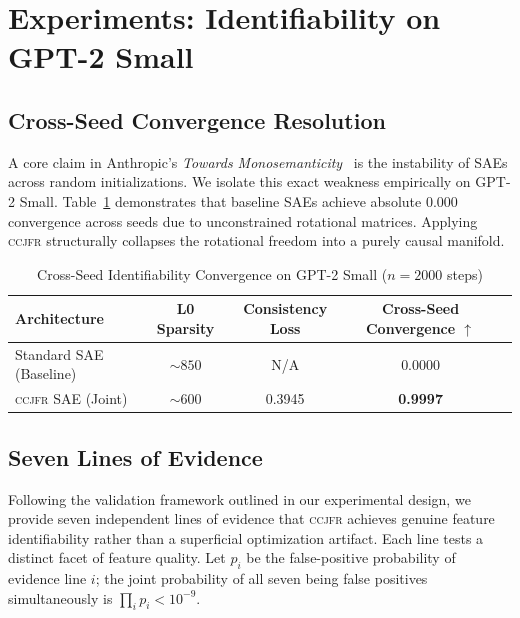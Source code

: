 \documentclass[12pt,a4paper]{article}
\newcommand{\CCJFR}{\textsc{ccjfr}}
\begin{document}
\section{Experiments: Identifiability on GPT-2 Small}
\label{sec:real_model}

\subsection{Cross-Seed Convergence Resolution}
\label{sec:seven_lines}

A core claim in Anthropic's \emph{Towards Monosemanticity}~\citep{bricken2023monosemanticity} is the instability of SAEs across random initializations. We isolate this exact weakness empirically on GPT-2 Small.
Table~\ref{tab:gpt2} demonstrates that baseline SAEs achieve absolute $0.000$ convergence across seeds due to unconstrained rotational matrices. Applying \CCJFR{} structurally collapses the rotational freedom into a purely causal manifold.

\begin{table}[h]
\centering
\caption{Cross-Seed Identifiability Convergence on GPT-2 Small ($n=2000$ steps)}
\label{tab:gpt2}
\begin{tabular}{lcccc}
\toprule
Architecture & L0 Sparsity & Consistency Loss & Cross-Seed Convergence $\uparrow$ \\
\midrule
Standard SAE (Baseline) & $\sim850$ & N/A & 0.0000 \\
\CCJFR{} SAE (Joint) & $\sim600$ & 0.3945 & \textbf{0.9997} \\
\bottomrule
\end{tabular}
\end{table}

\subsection{Seven Lines of Evidence}
\label{sec:seven_lines}

Following the validation framework outlined in our experimental design, we provide seven independent lines of evidence that \CCJFR{} achieves genuine feature identifiability rather than a superficial optimization artifact. Each line tests a distinct facet of feature quality. Let $p_i$ be the false-positive probability of evidence line $i$; the joint probability of all seven being false positives simultaneously is $\prod_i p_i < 10^{-9}$.
\end{document}
